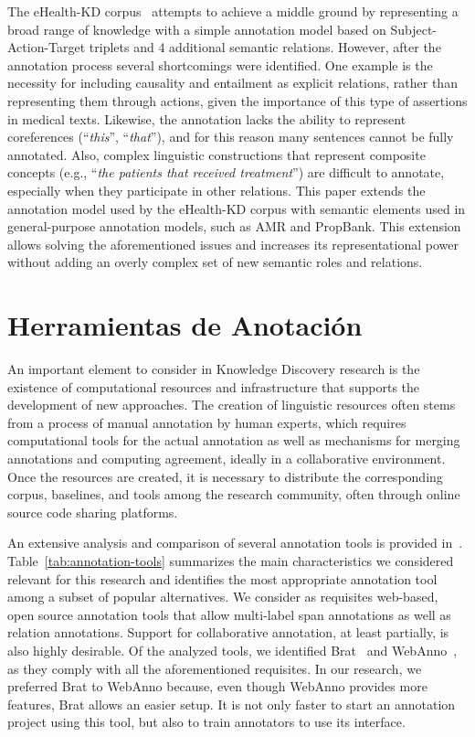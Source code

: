  The {eHealth-KD} corpus~\cite{martinez2018overview} attempts to achieve a middle ground by representing a broad range of knowledge with a simple annotation model based on Subject-Action-Target triplets and 4 additional semantic relations.
  However, after the annotation process several shortcomings were identified.
  One example is the necessity for including {causality} and {entailment} as explicit relations, rather than representing them through actions, given the importance of this type of assertions in medical texts.
  Likewise, the annotation lacks the ability to represent coreferences (``\textit{this}'', ``\textit{that}''), and for this reason many sentences cannot be fully annotated.
  Also, complex linguistic constructions that represent composite concepts (e.g., ``\textit{the patients that received treatment}'') are difficult to annotate, especially when they participate in other relations.
  This paper extends the annotation model used by the eHealth-KD corpus with semantic elements used in general-purpose annotation models, such as AMR and PropBank.
  This extension allows solving the aforementioned issues and increases its representational power without adding an overly complex set of new semantic roles and relations.

  \section{Herramientas de Anotación}

  An important element to consider in Knowledge Discovery research is the existence of computational
  resources and infrastructure that supports the development of new approaches.
  The creation of linguistic resources often stems from a process of manual annotation by human
  experts, which requires computational tools for the actual annotation as well as mechanisms for merging
  annotations and computing agreement, ideally in a collaborative environment.
  Once the resources are created, it is necessary to distribute the corresponding corpus, baselines, and tools among the research community, often through online source code sharing platforms.

  An extensive analysis and comparison of several annotation tools is provided in~\citet{annotation-tools}.
  Table~\ref{tab:annotation-tools} summarizes the main characteristics we considered relevant for this research and identifies the most appropriate annotation tool among  a subset of  popular alternatives.
  We consider as requisites web-based, open source annotation tools that allow multi-label span annotations as well as relation annotations. Support for collaborative annotation, at least partially, is also highly desirable.
  Of the analyzed tools, we identified Brat~\cite{brat} and WebAnno~\cite{webanno}, as they comply with all the aforementioned requisites. In our research, we preferred Brat to WebAnno because, even though WebAnno provides more features, Brat allows an easier setup. It is not only faster to start an annotation project using this tool, but also to train annotators to use its interface.

